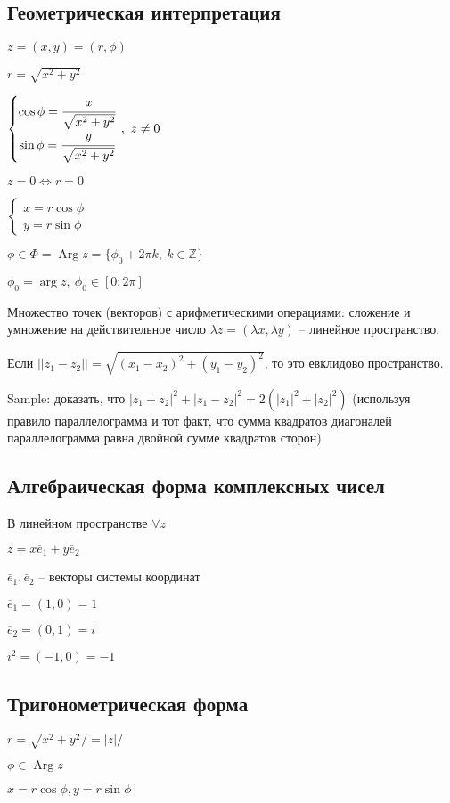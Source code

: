 \documentclass[final]{report}
\newcommand{\Z}{\mathbb{Z}}
\newcommand{\LRA}{\Leftrightarrow}
\renewcommand{\bar}{\overline}
\newcommand{\Arg}{\mathop{\mathrm{Arg}}\nolimits}
\theoremstyle{remark}
\begin{document}
\subsection{Геометрическая интерпретация}
$z=(x,y)=(r,\phi)$

$r=\sqrt{x^2+y^2}$

$\left\{\begin{matrix}
\cos\phi=\cfrac{x}{\sqrt{x^2+y^2}} \\
\sin\phi=\cfrac{y}{\sqrt{x^2+y^2}}
\end{matrix}\right.\,,\ z\neq0$

$z=0\LRA r=0$

$\left\{\begin{matrix}
x=r\cos\phi\\
y=r\sin\phi
\end{matrix}\right.$

$\phi\in\Phi=\Arg z=\{\phi_0+2\pi k,\ k\in\Z\}$

$\phi_0=\arg z,\ \phi_0\in[0;2\pi]$

Множество точек (векторов) с арифметическими операциями: сложение и умножение на действительное число $\lambda z=(\lambda x, \lambda y)$ -- линейное пространство.

Если $||z_1-z_2||=\sqrt{(x_1-x_2)^2+(y_1-y_2)^2}$, то это евклидово пространство.

Sample: доказать, что $|z_1+z_2|^2+|z_1-z_2|^2=2(|z_1|^2+|z_2|^2)$ (используя правило параллелограмма и тот факт, что сумма квадратов диагоналей параллелограмма равна двойной сумме квадратов сторон)

\subsection{Алгебраическая форма комплексных чисел}
В линейном пространстве $\forall z$

$z=x\bar{e}_1+y\bar{e}_2$

$\bar{e}_1,\bar{e}_2$ -- векторы системы координат

$\bar{e}_1=(1,0)=1$

$\bar{e}_2=(0,1)=i$

$i^2=(-1,0)=-1$

\subsection{Тригонометрическая форма}
$r=\sqrt{x^2+y^2}/=|z|/$

$\phi\in \Arg z$

$x=r\cos\phi, y=r\sin\phi$
\end{document}
